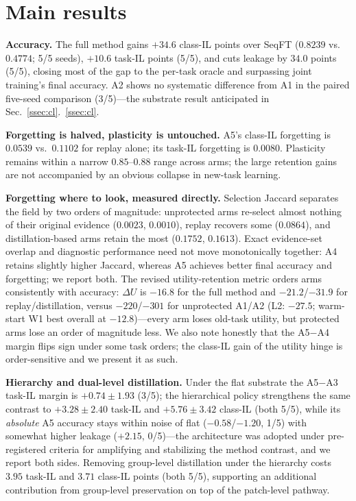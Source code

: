 \documentclass{article}
\begin{document}
\section{Main results}
\label{sec:results}
\textbf{Accuracy.} The full method gains $+34.6$ class-IL points over SeqFT ($0.8239$ vs.\ $0.4774$; 5/5 seeds), $+10.6$ task-IL points (5/5), and cuts leakage by $34.0$ points (5/5), closing most of the gap to the per-task oracle and surpassing joint training's final accuracy. A2 shows no systematic difference from A1 in the paired five-seed comparison (3/5)---the substrate result anticipated in Sec.~\ref{ssec:cl}.~\ref{ssec:cl}.

\textbf{Forgetting is halved, plasticity is untouched.} A5's class-IL forgetting is $0.0539$ vs.\ $0.1102$ for replay alone; its task-IL forgetting is $0.0080$. Plasticity remains within a narrow $0.85$--$0.88$ range across arms; the large retention gains are not accompanied by an obvious collapse in new-task learning.

\textbf{Forgetting where to look, measured directly.} Selection Jaccard separates the field by two orders of magnitude: unprotected arms re-select almost nothing of their original evidence ($0.0023$, $0.0010$), replay recovers some ($0.0864$), and distillation-based arms retain the most ($0.1752$, $0.1613$). Exact evidence-set overlap and diagnostic performance need not move monotonically together: A4 retains slightly higher Jaccard, whereas A5 achieves better final accuracy and forgetting; we report both. The revised utility-retention metric orders arms consistently with accuracy: $\Delta U$ is $-16.8$ for the full method and $-21.2$/$-31.9$ for replay/distillation, versus $-220$/$-301$ for unprotected A1/A2 (L2: $-27.5$; warm-start W1 best overall at $-12.8$)---every arm loses old-task utility, but protected arms lose an order of magnitude less. We also note honestly that the A5$-$A4 margin flips sign under some task orders; the class-IL gain of the utility hinge is order-sensitive and we present it as such.

\textbf{Hierarchy and dual-level distillation.} Under the flat substrate the A5$-$A3 task-IL margin is $+0.74{\pm}1.93$ (3/5); the hierarchical policy strengthens the same contrast to $+3.28{\pm}2.40$ task-IL and $+5.76{\pm}3.42$ class-IL (both 5/5), while its \emph{absolute} A5 accuracy stays within noise of flat ($-0.58$/$-1.20$, 1/5) with somewhat higher leakage ($+2.15$, 0/5)---the architecture was adopted under pre-registered criteria for amplifying and stabilizing the method contrast, and we report both sides. Removing group-level distillation under the hierarchy costs $3.95$ task-IL and $3.71$ class-IL points (both 5/5), supporting an additional contribution from group-level preservation on top of the patch-level pathway.
\end{document}
